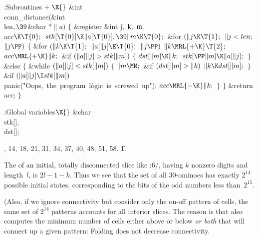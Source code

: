\Y\B\4:Subroutines\X${}\mathrel+\E{}$\6
\&{int} \\{conn\_distance}(\&{int} \\{len}${},\39{}$\&{char} ${}{*}\|a){}$\1\1%
\2\2\6
${}\{{}$\1\6
\&{register} \&{int} \|j${},{}$ \|k${},{}$ \|m${},{}$ \\{acc}${}\K\T{0};{}$\7
${}\\{stk}[\T{0}]\K\|a[\T{0}],\39\|m\K\T{0};{}$\6
\&{for} ${}(\|j\K\T{1};{}$ ${}\|j<\\{len};{}$ ${}\|j\PP){}$\5
${}\{{}$\1\6
\&{for} ${}(\|k\K\T{1};{}$ ${}\|a[\|j]\E\T{0};{}$ ${}\|j\PP){}$\1\5
${}\|k\MRL{+{\K}}\T{2};{}$\2\6
${}\\{acc}\MRL{+{\K}}\|k;{}$\6
\&{if} ${}(\|a[\|j]>\\{stk}[\|m]){}$\5
${}\{{}$\1\6
${}\\{dst}[\|m]\K\|k;{}$\6
${}\\{stk}[\PP\|m]\K\|a[\|j];{}$\6
\4${}\}{}$\5
\2\&{else}\5
${}\{{}$\1\6
\&{while} ${}(\|a[\|j]<\\{stk}[\|m]){}$\5
${}\{{}$\1\6
${}\|m\MM;{}$\6
\&{if} ${}(\\{dst}[\|m]>\|k){}$\1\5
${}\|k\K\\{dst}[\|m];{}$\2\6
\4${}\}{}$\2\6
\&{if} ${}(\|a[\|j]\I\\{stk}[\|m]){}$\1\5
\\{panic}(\.{"Oops,\ the\ program\ l}\)\.{ogic\ is\ screwed\ up"});\2\6
${}\\{acc}\MRL{-{\K}}\|k;{}$\6
\4${}\}{}$\2\6
\4${}\}{}$\2\6
\&{return} \\{acc};\6
\4${}\}{}$\2\par
\fi

\B{}:Global variables\X${}\E{}$\6
\&{char} \\{stk}[]${},{}$ \\{dst}[];\par
{}, 14, 18, 21, 31, 34, 37, 40, 48, 51, 58.
\U1.\fi

The  of an initial, totally
disconnected slice like
:6/, having $k$ nonzero digits and length~$l$, is $2l-1-k$.
Thus we see that the set of all 30-ominoes has exactly $2^{14}$ possible
initial states, corresponding to the bits of the odd numbers less
than~$2^{15}$.

(Also, if we ignore connectivity but consider only the on-off pattern of
cells, the same set of $2^{14}$ patterns accounts for all interior slices.
The reason is that  also computes the minimum number of
cells either above or below {\it or both\/} that will connect up a
given pattern: Folding does not decrease connectivity.

